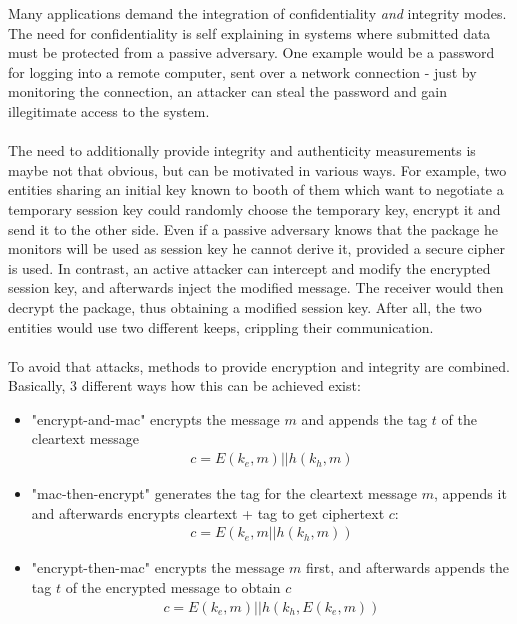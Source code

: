 Many applications demand the integration of confidentiality \textit{and} integrity modes. The need for confidentiality is self explaining in systems where
submitted data must be protected from a passive adversary. One example would be a password for logging into a remote computer, sent over a network connection
- just by monitoring the connection, an attacker can steal the password and gain illegitimate access to the system.
\\
\\
The need to additionally provide integrity and authenticity measurements is maybe not that obvious, but can be motivated in various ways. For example, two entities
sharing an initial key known to booth of them which want to negotiate a temporary session key could randomly choose the temporary key, encrypt it and send it
to the other side. Even if a passive adversary knows that the package he monitors will be used as session key he cannot derive it, provided a secure cipher is
used.  In contrast, an active attacker can intercept and modify the encrypted session key, and afterwards inject the modified message. The receiver
would then decrypt the package, thus obtaining a modified session key. After all, the two entities would use two different keeps, crippling their communication.
\\
\\
To avoid that attacks, methods to provide encryption and integrity are combined. Basically, 3 different ways how this can be achieved exist:
\begin{itemize}
 \item "encrypt-and-mac" encrypts the message $m$ and appends the tag $t$ of the cleartext message
 \begin{align}\label{encAndMac}
  c = E(k_e, m) || h(k_h, m)
 \end{align}
 \item "mac-then-encrypt" generates the tag for the cleartext message $m$, appends it and afterwards encrypts cleartext + tag to get ciphertext $c$:
 \begin{align}\label{macThenEnc}
  c = E(k_e, m || h(k_h, m))
 \end{align}
 \item "encrypt-then-mac" encrypts the message $m$ first, and afterwards appends the tag $t$ of the encrypted message to obtain $c$
 \begin{align}\label{encThenMac}
  c = E(k_e, m) || h(k_h, E(k_e, m))
 \end{align}
\end{itemize}
